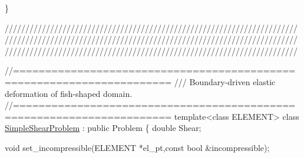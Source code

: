 \begin{DoxyCodeInclude}
\}

\textcolor{comment}{}
\textcolor{comment}{///////////////////////////////////////////////////////////////////////}
\textcolor{comment}{///////////////////////////////////////////////////////////////////////}
\textcolor{comment}{///////////////////////////////////////////////////////////////////////}
\textcolor{comment}{}


\textcolor{comment}{//====================================================================== }\textcolor{comment}{}
\textcolor{comment}{/// Boundary-driven elastic deformation of fish-shaped domain.}
\textcolor{comment}{}\textcolor{comment}{//====================================================================== }
\textcolor{keyword}{template}<\textcolor{keyword}{class} ELEMENT>
\textcolor{keyword}{class }\hyperlink{classSimpleShearProblem}{SimpleShearProblem} : \textcolor{keyword}{public} Problem
\{
 \textcolor{keywordtype}{double} Shear;

 \textcolor{keywordtype}{void} set\_incompressible(ELEMENT *el\_pt,\textcolor{keyword}{const} \textcolor{keywordtype}{bool} &incompressible);


\end{DoxyCodeInclude}
